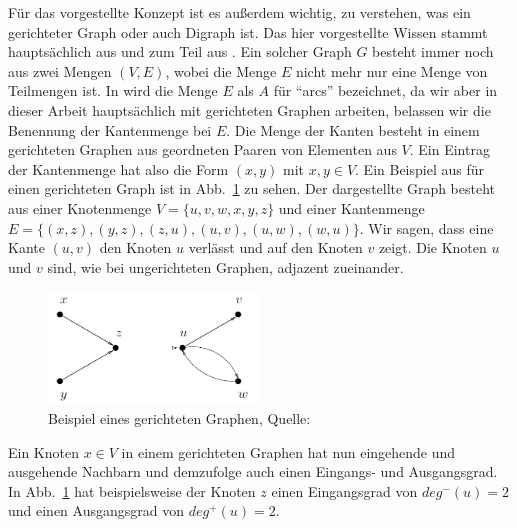 \documentclass[12pt, a4paper]{article}
\begin{document}
Für das vorgestellte Konzept ist es außerdem wichtig, zu verstehen, was ein gerichteter Graph oder auch Digraph ist. Das hier vorgestellte Wissen stammt hauptsächlich aus  und zum Teil aus . Ein solcher Graph $G$ besteht immer noch aus zwei Mengen $(V, E)$, wobei die Menge $E$ nicht mehr nur eine Menge von Teilmengen ist. In  wird die Menge $E$ als $A$ für "`arcs"' bezeichnet, da wir aber in dieser Arbeit hauptsächlich mit gerichteten Graphen arbeiten, belassen wir die Benennung der Kantenmenge bei $E$. Die Menge der Kanten besteht in einem gerichteten Graphen aus geordneten Paaren von Elementen aus $V$. Ein Eintrag der Kantenmenge hat also die Form $(x, y)$ mit $x,y \in V$. Ein Beispiel aus  für einen gerichteten Graph ist in Abb.~\ref{example_digraph_BangJensenGutin} zu sehen. Der dargestellte Graph besteht aus einer Knotenmenge $V = \{u, v, w, x, y, z\}$ und einer Kantenmenge $E = \{(x, z), (y, z), (z, u), (u, v), (u, w), (w, u)\}$. Wir sagen, dass eine Kante $(u, v)$ den Knoten $u$ verlässt und auf den Knoten $v$ zeigt. Die Knoten $u$ und $v$ sind, wie bei ungerichteten Graphen, adjazent zueinander.\\

\begin{figure}[h!]
\centering
\includegraphics[width=0.5\textwidth]{example_digraph_BangJensenGutin.png}
\caption[Beispiel eines gerichteten Graphen]{Beispiel eines gerichteten Graphen, Quelle: \protect\cite{bang2008digraphs}}
\label{example_digraph_BangJensenGutin}
\end{figure}

Ein Knoten $x \in V$ in einem gerichteten Graphen hat nun eingehende und ausgehende Nachbarn und demzufolge auch einen Eingangs- und Ausgangsgrad. In Abb.~\ref{example_digraph_BangJensenGutin} hat beispielsweise der Knoten $z$ einen Eingangsgrad von $deg^-(u) = 2$ und einen Ausgangsgrad von $deg^+(u) = 2$.\\
\end{document}

